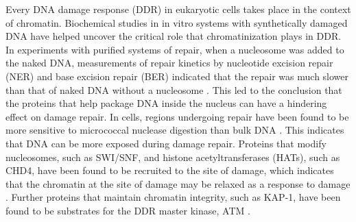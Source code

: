 Every DNA damage response (DDR) in eukaryotic cells takes place in the context of chromatin. Biochemical studies in in vitro systems with synthetically damaged DNA have helped uncover the critical role that chromatinization plays in DDR. In experiments with purified systems of repair, when a nucleosome was added to the naked DNA, measurements of repair kinetics by nucleotide excision repair (NER) and base excision repair (BER) indicated that the repair was much slower than that of naked DNA without a nucleosome \cite{hara2000dna,odell2011nucleosome}. This led to the conclusion that the proteins that help package DNA inside the nucleus can have a hindering effect on damage repair. In cells, regions undergoing repair have been found to be more sensitive to micrococcal nuclease digestion than bulk DNA \cite{smerdon1978distribution}. This indicates that DNA can be more exposed during damage repair. Proteins that modify nucleosomes, such as SWI/SNF, and histone acetyltransferases (HATs), such as CHD4, have been found to be recruited to the site of damage, which indicates that the chromatin at the site of damage may be relaxed as a response to damage \cite{park2006mammalian, polo2010regulation}. Further proteins that maintain chromatin integrity, such as KAP-1, have been found to be substrates for the DDR master kinase, ATM \cite{ziv2006chromatin}.

